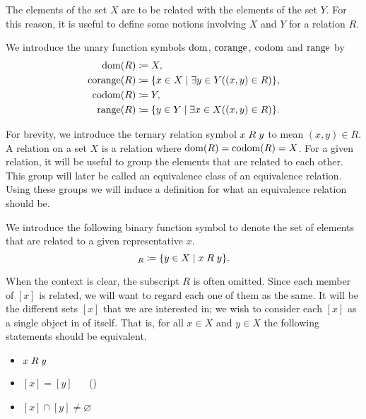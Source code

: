 \documentclass[../main.tex]{subfiles}
\begin{document}
The elements of the set $X$ are to be related with the elements of the set $Y$. For this reason, it is useful to define some notions involving $X$ and $Y$ for a relation $R$.
\begin{definition}
    We introduce the unary function symbols $\operatorname{dom}$, $\operatorname{corange}$, $\operatorname{codom}$ and $\operatorname{range}$ by
    \begin{align*}
        \operatorname{dom}(R) & \coloneq X, \\
        \operatorname{corange}(R) & \coloneq\{x\in X\mid\exists y\in Y((x,y)\in R)\}, \\
        \operatorname{codom}(R) & \coloneq Y, \\
        \operatorname{range}(R) & \coloneq\{y\in Y\mid\exists x\in X((x,y)\in R)\}.
    \end{align*}
\end{definition}
For brevity, we introduce the ternary relation symbol $x\mathrel{R} y$ to mean $(x,y)\in R$. A relation on a set $X$ is a relation where $\operatorname{dom}(R)=\operatorname{codom}(R)=X$. For a given relation, it will be useful to group the elements that are related to each other. This group will later be called an equivalence class of an equivalence relation. Using these groups we will induce a definition for what an equivalence relation should be.
\begin{definition}\label{dfn:zermelo_fraenkel_set_theory:equivalence_relation}
    We introduce the following binary function symbol to denote the set of elements that are related to a given representative $x$.
    \begin{equation*}
        [x]_R\coloneq\{y\in X\mid x\relR y\}.
    \end{equation*}
\end{definition}
When the context is clear, the subscript $R$ is often omitted. Since each member of $[x]$ is related, we will want to regard each one of them as the same. It will be the different sets $[x]$ that we are interested in; we wish to consider each $[x]$ as a single object in of itself. That is, for all $x\in X$ and $y\in X$ the following statements should be equivalent.
\begin{itemize}
    \item $x\mathrel{R} y$
    \item $[x]=[y]$ ~~ \hspace*{\fill} \mbox{(\theequation)}\label{eqn:zermelo_fraenkel_set_theory:equivalence_relation}
    \item $[x]\cap[y]\neq\varnothing$
\end{itemize}
\end{document}

